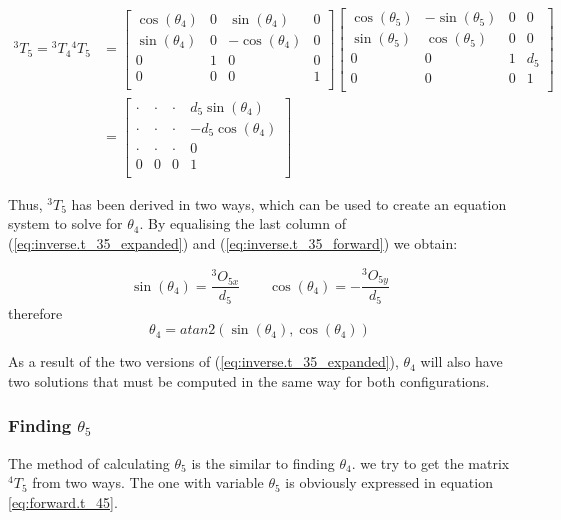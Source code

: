 \documentclass{article}
\renewcommand{\c}[1]{\cos(\theta_{#1})}
\newcommand{\s}[1]{\sin(\theta_{#1})}
\newcommand{\T}[2]{{}^{#1}T_{#2}}
\renewcommand{\O}[2]{{}^{#1}O_{#2}}
\begin{document}
\begin{equation}
\begin{aligned}
\label{eq:inverse.t_35_forward}
\T{3}{5} = \T{3}{4} \T{4}{5} & =
\left[
\begin{array}{cccc}
	\c{4} & 0 & \s{4} & 0 \\
	\s{4} & 0 & -\c{4} & 0 \\
	0 & 1 & 0 & 0 \\
	0 & 0 & 0 & 1 \\
\end{array}
\right] \left[
\begin{array}{cccc}
	\c{5} & -\s{5} & 0 & 0 \\
	\s{5} & \c{5} & 0 & 0  \\
	0 & 0 & 1 & d_5\\
	0 & 0 & 0 & 1 \\
\end{array}
\right] \\
& = \left[
\begin{array}{cccc}
	\cdot & \cdot & \cdot & d_5\s{4} \\
	\cdot & \cdot & \cdot & -d_5\c{4}\\
	\cdot & \cdot & \cdot & 0\\
    0 & 0 & 0 & 1 \\
\end{array}
\right] 
\end{aligned}
\end{equation}

Thus, $\T{3}{5}$ has been derived in two ways, which can be used to create an equation system to solve for $\theta_4$. By equalising the last column of (\ref{eq:inverse.t_35_expanded}) and (\ref{eq:inverse.t_35_forward}) we obtain:

\begin{equation}
\s{4} = \frac{\O{3}{5x}}{d_5}
\qquad
\c{4} = -\frac{\O{3}{5y}}{d_5}
\end{equation}
therefore
\begin{equation}
\theta_{4} = atan2(\s{4},\c{4})
\end{equation}

As a result of the two versions of (\ref{eq:inverse.t_35_expanded}), $\theta_4$ will also have two solutions that must be computed in the same way for both configurations.

\subsubsection{Finding $\theta_5$}
The method of calculating $\theta_5$ is the similar to finding $\theta_4$. we try to get the matrix  $\T{4}{5}$ from two ways. The one with variable $\theta_5$ is obviously expressed in equation \ref{eq:forward.t_45}.
\end{document}
